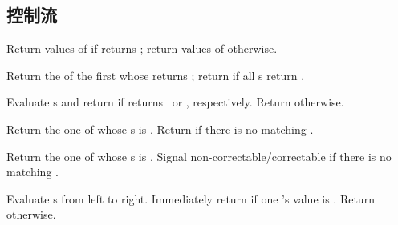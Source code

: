 \subsection{控制流}
\begin{LIST}{1cm}

  {
    Return values of  if  returns \T;
    return values of  otherwise. 
  }

  {
  Return the  of the first  whose
   returns \T; return \retval{\NIL} if all s
  return \NIL.
  }

  {
    Evaluate s and return  if 
    returns \T\ or \NIL, respectively. Return \retval{\NIL} otherwise. 
  }

  {
    Return the  one of
    whose s is  . Return  if there is no matching .
  }

  {
    Return the  one of
    whose s is  .  Signal
    non-correctable/correctable  if there is no
    matching .
  }

  {
    Evaluate s from left to right. Immediately return
    \retval{\NIL} if one 's value is \NIL. Return
     otherwise.
  }


\end{LIST}
